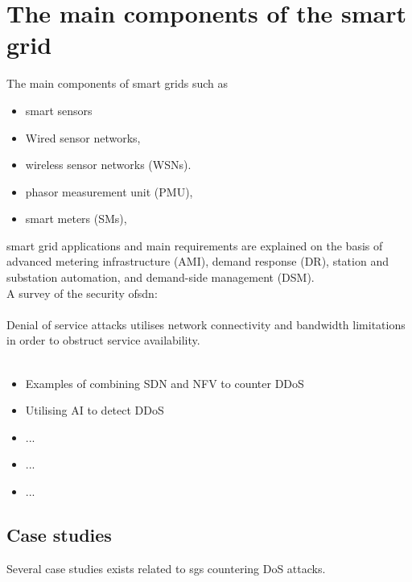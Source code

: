 \section{The main components of the smart grid}
 The main components of smart grids such as
\begin{itemize}
\item smart sensors
\item Wired sensor networks, 
\item wireless sensor networks (WSNs).
\item phasor measurement unit (PMU), 
\item smart meters (SMs), 

\end{itemize}

smart grid applications and main requirements are
explained on the basis of advanced metering infrastructure (AMI), demand response
(DR), station and substation automation, and demand-side management (DSM).\\ 




A survey of the security of\acrlong{sdn}\cite{ALSMADI201579}:\\
\\


Denial of service attacks utilises network connectivity and bandwidth limitations in order to obstruct service availability\cite{Asri_Pranggono_2015}. \\
 \\ 

\begin{itemize}

\item{Examples of combining SDN and NFV to counter DDoS} 

\item{Utilising AI to detect DDoS} 

\item...
 

\item...


\item ...
\end{itemize}





\subsection{Case studies}
Several case studies exists related to \acrlong{sg}s countering DoS attacks.

